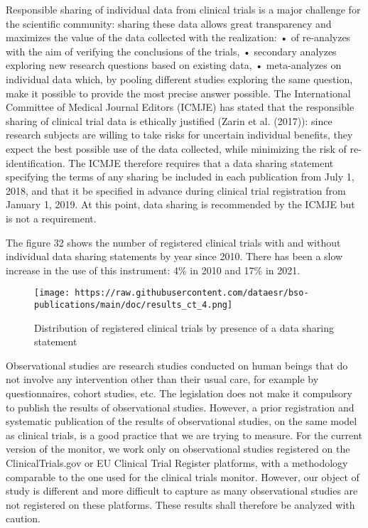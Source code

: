 \documentclass[
]{article}
\begin{document}
Responsible sharing of individual data from clinical trials is a major
challenge for the scientific community: sharing these data allows great
transparency and maximizes the value of the data collected with the
realization: • of re-analyzes with the aim of verifying the conclusions
of the trials, • secondary analyzes exploring new research questions
based on existing data, • meta-analyzes on individual data which, by
pooling different studies exploring the same question, make it possible
to provide the most precise answer possible. The International Committee
of Medical Journal Editors (ICMJE) has stated that the responsible
sharing of clinical trial data is ethically justified (Zarin et al.
(2017)): since research subjects are willing to take risks for uncertain
individual benefits, they expect the best possible use of the data
collected, while minimizing the risk of re-identification. The ICMJE
therefore requires that a data sharing statement specifying the terms of
any sharing be included in each publication from July 1, 2018, and that
it be specified in advance during clinical trial registration from
January 1, 2019. At this point, data sharing is recommended by the ICMJE
but is not a requirement.

The figure 32 shows the number of registered clinical trials with and
without individual data sharing statements by year since 2010. There has
been a slow increase in the use of this instrument: 4\% in 2010 and 17\%
in 2021.

\begin{figure}
\centering
\texttt{[image: https://raw.githubusercontent.com/dataesr/bso-publications/main/doc/results\_ct\_4.png]}
\caption{Distribution of registered clinical trials by presence of a
data sharing statement}
\end{figure}

Observational studies are research studies conducted on human beings
that do not involve any intervention other than their usual care, for
example by questionnaires, cohort studies, etc. The legislation does not
make it compulsory to publish the results of observational studies.
However, a prior registration and systematic publication of the results
of observational studies, on the same model as clinical trials, is a
good practice that we are trying to measure. For the current version of
the monitor, we work only on observational studies registered on the
ClinicalTrials.gov or EU Clinical Trial Register platforms, with a
methodology comparable to the one used for the clinical trials monitor.
However, our object of study is different and more difficult to capture
as many observational studies are not registered on these platforms.
These results shall therefore be analyzed with caution.
\end{document}
